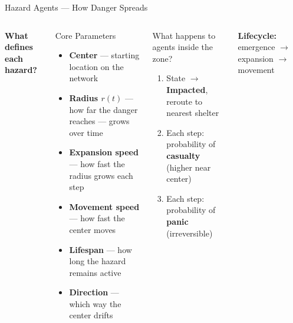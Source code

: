 \documentclass[aspectratio=169, xcolor=table]{beamer}
\newcommand{\parambox}[2]{\textcolor{highlightblue}{\textbf{#1}} {\scriptsize--- #2}}
\begin{document}
\begin{frame}[t,shrink=10]{Hazard Agents --- How Danger Spreads}
\footnotesize

\begin{columns}[T,onlytextwidth]
\textbf{What defines each hazard?}
\vspace{0.2em}

\begin{block}{\scriptsize Core Parameters}
\scriptsize
\begin{itemize}\itemsep0.3em
  \item \parambox{Center}{starting location on the network}
  \item \parambox{Radius $r(t)$}{how far the danger reaches --- grows over time}
  \item \parambox{Expansion speed}{how fast the radius grows each step}
  \item \parambox{Movement speed}{how fast the center moves}
  \item \parambox{Lifespan}{how long the hazard remains active}
  \item \parambox{Direction}{which way the center drifts}
\end{itemize}
\end{block}

\vspace{0.2em}
\begin{alertblock}{\scriptsize What happens to agents inside the zone?}
\scriptsize
\begin{enumerate}\itemsep0.15em
  \item State $\to$ \textcolor{stateimpacted}{\textbf{Impacted}}, reroute to nearest shelter
  \item Each step: probability of \textcolor{statecasualty}{\textbf{casualty}} (higher near center)
  \item Each step: probability of \textcolor{highlightred}{\textbf{panic}} (irreversible)
\end{enumerate}
\end{alertblock}

\vspace{0.3em}
\begin{center}
\textbf{Lifecycle:} emergence $\to$ expansion $\to$ movement
\vspace{0.3em}


\end{center}
\end{columns}
\end{frame}
\end{document}
